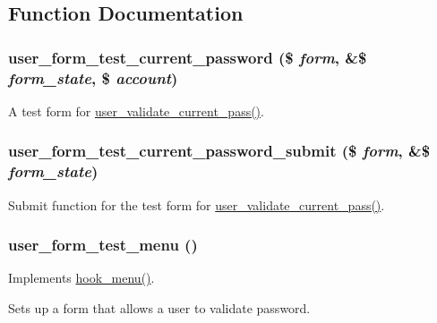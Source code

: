 \subsection{Function Documentation}
\hypertarget{user__form__test_8module_a7b26826dd7d47decdeb7b559cbe39a9f}{
\subsubsection[{user\_\-form\_\-test\_\-current\_\-password}]{\setlength{\rightskip}{0pt plus 5cm}user\_\-form\_\-test\_\-current\_\-password (\$ {\em form}, \/  \&\$ {\em form\_\-state}, \/  \$ {\em account})}}
\label{user__form__test_8module_a7b26826dd7d47decdeb7b559cbe39a9f}
A test form for \hyperlink{user_8module_a129d5503ac6de8cdf01d11b18e2c7298}{user\_\-validate\_\-current\_\-pass()}. \hypertarget{user__form__test_8module_abfae7592659f4e6f4cc15dcfdf79ec9c}{
\subsubsection[{user\_\-form\_\-test\_\-current\_\-password\_\-submit}]{\setlength{\rightskip}{0pt plus 5cm}user\_\-form\_\-test\_\-current\_\-password\_\-submit (\$ {\em form}, \/  \&\$ {\em form\_\-state})}}
\label{user__form__test_8module_abfae7592659f4e6f4cc15dcfdf79ec9c}
Submit function for the test form for \hyperlink{user_8module_a129d5503ac6de8cdf01d11b18e2c7298}{user\_\-validate\_\-current\_\-pass()}. \hypertarget{user__form__test_8module_a01801535f51daf09609ed5b79c5ae906}{
\subsubsection[{user\_\-form\_\-test\_\-menu}]{\setlength{\rightskip}{0pt plus 5cm}user\_\-form\_\-test\_\-menu ()}}
\label{user__form__test_8module_a01801535f51daf09609ed5b79c5ae906}
Implements \hyperlink{group__hooks_ga5c95244fea59b25666e409759e133ded}{hook\_\-menu()}.

Sets up a form that allows a user to validate password. 